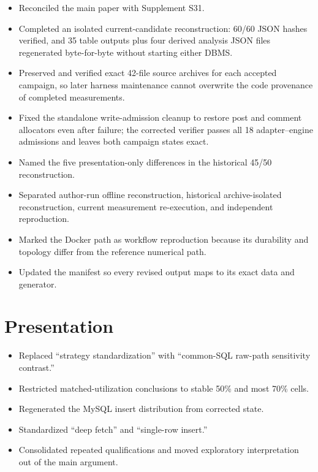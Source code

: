 \documentclass[11pt,a4paper]{article}
\begin{document}
\begin{itemize}
  \item Reconciled the main paper with Supplement S31.
  \item Completed an isolated current-candidate reconstruction: 60/60 JSON hashes verified, and 35 table outputs plus four derived analysis JSON files regenerated byte-for-byte without starting either DBMS.
  \item Preserved and verified exact 42-file source archives for each accepted campaign, so later harness maintenance cannot overwrite the code provenance of completed measurements.
  \item Fixed the standalone write-admission cleanup to restore post and comment allocators even after failure; the corrected verifier passes all 18 adapter--engine admissions and leaves both campaign states exact.
  \item Named the five presentation-only differences in the historical 45/50 reconstruction.
  \item Separated author-run offline reconstruction, historical archive-isolated reconstruction, current measurement re-execution, and independent reproduction.
  \item Marked the Docker path as workflow reproduction because its durability and topology differ from the reference numerical path.
  \item Updated the manifest so every revised output maps to its exact data and generator.
\end{itemize}

\section*{Presentation}

\begin{itemize}
  \item Replaced ``strategy standardization'' with ``common-SQL raw-path sensitivity contrast.''
  \item Restricted matched-utilization conclusions to stable 50\% and most 70\% cells.
  \item Regenerated the MySQL insert distribution from corrected state.
  \item Standardized ``deep fetch'' and ``single-row insert.''
  \item Consolidated repeated qualifications and moved exploratory interpretation out of the main argument.
\end{itemize}
\end{document}
